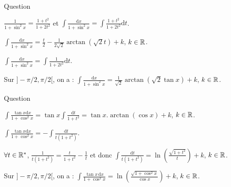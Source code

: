\begin{multi}[multiple,feedback=
{Avec \(t=\tan x\), on aura \(\displaystyle \frac{1}{1+\sin ^2x}=\frac{1+t^2}{1+2t^2}\) et \(\displaystyle \mathrm{d}x=\frac{\mathrm{d}t}{1+t^2}\). D'où
\[\int \frac{\mathrm{d}x}{1+\sin ^2x}=\int \frac{\mathrm{d}t}{1+2t^2}=\frac{1}{\sqrt{2}}\arctan(\sqrt{2}t)+k,\; k\in \Rr.\]
}]{Question}
    \item \(\displaystyle \frac{1}{1+\sin ^2x}=\frac{1+t^2}{1+2t^2}\) et \(\displaystyle \int \frac{\mathrm{d}x}{1+\sin ^2x}=\int \frac{1+t^2}{1+2t^2}\mathrm{d}t\).
    \item \(\displaystyle \int \frac{\mathrm{d}x}{1+\sin ^2x}=\frac{t}{2}-\frac{1}{2\sqrt{2}}\arctan(\sqrt{2}t)+k\), \(k\in \mathbb{R}\).
    \item* \(\displaystyle \int \frac{\mathrm{d}x}{1+\sin ^2x}=\int \frac{1}{1+2t^2}\mathrm{d}t\).
    \item* Sur \(]-\pi/2,\pi/2[\), on a : \(\displaystyle \int \frac{\mathrm{d}x}{1+\sin ^2x}=\frac{1}{\sqrt{2}}\arctan\left(\sqrt{2}\tan x\right)+k\), \(k\in \mathbb{R}\).
\end{multi}


\begin{multi}[multiple,feedback=
{Avec \(t=\cos x\), on aura \(\displaystyle \frac{\tan x}{1+\cos ^2x}=\frac{\sin x}{\cos x(1+\cos ^2x)}\) et \(\displaystyle \mathrm{d}t=-\sin x\mathrm{d}x\). D'où
\[\int \frac{\tan x\mathrm{d}x}{1+\cos ^2x}=-\int \frac{\mathrm{d}t}{t(1+t^2)}=\frac{1}{2}\ln (1+t^2)-\ln |t|+k,\; k\in \Rr.\]
}]{Question}
    \item \(\displaystyle \int \frac{\tan x\mathrm{d}x}{1+\cos ^2x}=\tan x\int \frac{\mathrm{d}t}{1+t^2}=\tan x.\arctan (\cos x)+k\), \(k\in \mathbb{R}\).
    \item* \(\displaystyle \int \frac{\tan x\mathrm{d}x}{1+\cos ^2x}=-\int \frac{\mathrm{d}t}{t(1+t^2)}\).
    \item \(\forall t\in \mathbb{R}^*\), \(\displaystyle \frac{1}{t(1+t^2)}=\frac{t}{1+t^2}-\frac{1}{t}\) et donc \(\displaystyle \int \frac{\mathrm{d}t}{t(1+t^2)}=\ln \left(\frac{\sqrt{1+t^2}}{t}\right)+k\), \(k\in \mathbb{R}\).
    \item* Sur \(]-\pi/2,\pi/2[\), on a : \(\displaystyle \int \frac{\tan x\, \mathrm{d}x}{1+\cos ^2x}=\ln \left(\frac{\sqrt{1+\cos ^2x}}{\cos x}\right)+k\), \(k\in \mathbb{R}\).
\end{multi}


